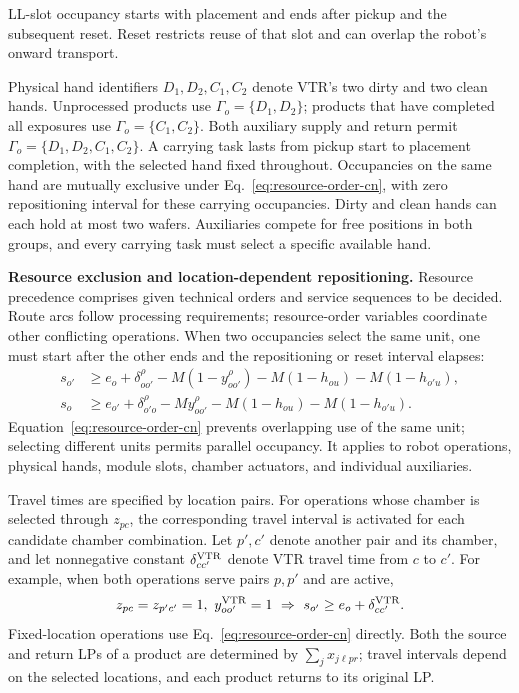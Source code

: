 \documentclass[final,5p,times,twocolumn]{elsarticle}
\begin{document}
LL-slot occupancy starts with placement and ends after pickup and the subsequent reset. Reset restricts reuse of that slot and can overlap the robot's onward transport.

Physical hand identifiers $D_1,D_2,C_1,C_2$ denote VTR's two dirty and two clean hands. Unprocessed products use $\Gamma_o=\{D_1,D_2\}$; products that have completed all exposures use $\Gamma_o=\{C_1,C_2\}$. Both auxiliary supply and return permit $\Gamma_o=\{D_1,D_2,C_1,C_2\}$. A carrying task lasts from pickup start to placement completion, with the selected hand fixed throughout. Occupancies on the same hand are mutually exclusive under Eq.~\eqref{eq:resource-order-cn}, with zero repositioning interval for these carrying occupancies. Dirty and clean hands can each hold at most two wafers. Auxiliaries compete for free positions in both groups, and every carrying task must select a specific available hand.

\noindent\textbf{Resource exclusion and location-dependent repositioning.}
Resource precedence comprises given technical orders and service sequences to be decided. Route arcs follow processing requirements; resource-order variables coordinate other conflicting operations. When two occupancies select the same unit, one must start after the other ends and the repositioning or reset interval elapses:
\begin{equation}
\begin{aligned}
s_{o'}&\ge e_o+\delta^\rho_{oo'}-M(1-y^\rho_{oo'})
-M(1-h_{ou})-M(1-h_{o'u}),\\
s_o&\ge e_{o'}+\delta^\rho_{o'o}-My^\rho_{oo'}
-M(1-h_{ou})-M(1-h_{o'u}).
\end{aligned}
\label{eq:resource-order-cn}
\end{equation}
Equation~\eqref{eq:resource-order-cn} prevents overlapping use of the same unit; selecting different units permits parallel occupancy. It applies to robot operations, physical hands, module slots, chamber actuators, and individual auxiliaries.

Travel times are specified by location pairs. For operations whose chamber is selected through $z_{pc}$, the corresponding travel interval is activated for each candidate chamber combination. Let $p',c'$ denote another pair and its chamber, and let nonnegative constant $\delta^{\rm VTR}_{cc'}$ denote VTR travel time from $c$ to $c'$. For example, when both operations serve pairs $p,p'$ and are active,
\begin{equation}
\begin{aligned}
z_{pc}=z_{p'c'}=1,\ y^{\rm VTR}_{oo'}=1
\ \Rightarrow\ s_{o'}\ge e_o+\delta^{\rm VTR}_{cc'}.
\end{aligned}
\label{eq:location-travel-cn}
\end{equation}
Fixed-location operations use Eq.~\eqref{eq:resource-order-cn} directly. Both the source and return LPs of a product are determined by $\sum_jx_{j\ell pr}$; travel intervals depend on the selected locations, and each product returns to its original LP.
\end{document}
